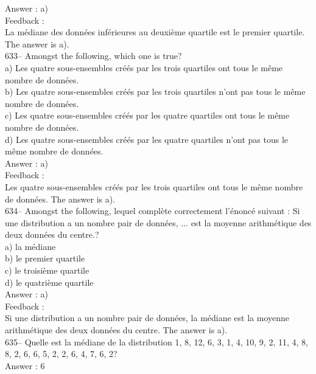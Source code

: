 ﻿\documentclass[letterpaper, 12pt]{article}
\begin{document}
Answer : a)\\

Feedback : \\
La m\'ediane des donn\'ees inf\'erieures au deuxi\`eme quartile est le
premier quartile.  The answer is a).\\

633-- Amongst the following, which one is true?\\
a) Les quatre sous-ensembles cr\'e\'es par les trois quartiles ont tous le
m\^eme nombre de donn\'ees.  \\
b) Les quatre sous-ensembles cr\'e\'es par les trois quartiles n'ont pas
tous le m\^eme nombre de donn\'ees.  \\
c) Les quatre sous-ensembles cr\'e\'es par les quatre quartiles ont tous le
m\^eme nombre de donn\'ees.  \\
d) Les quatre sous-ensembles cr\'e\'es par les quatre quartiles n'ont pas
tous le m\^eme nombre de donn\'ees.  \\

Answer : a)\\

Feedback : \\
Les quatre sous-ensembles cr\'e\'es par les trois quartiles ont tous le
m\^eme nombre de donn\'ees.  The answer is a).\\

634-- Amongst the following, lequel compl\`ete
correctement l'\'enonc\'e suivant : \og Si une distribution a un
nombre pair de donn\'ees, $\ldots$ est la moyenne arithm\'etique des deux donn\'ees du centre.\fg?\\
a) la m\'ediane\\
b) le premier quartile\\
c) le troisi\`eme quartile\\
d) le quatri\`eme quartile\\

Answer : a)\\

Feedback :\\
Si une distribution a un nombre pair de donn\'ees, la m\'ediane est la
moyenne arithm\'etique des deux donn\'ees du centre.  The answer is a).
\\

635--  Quelle est la m\'ediane de la distribution 1, 8, 12, 6, 3, 1, 4, 10,
9, 2, 11, 4, 8, 8, 2, 6, 6, 5, 2, 2, 6, 4, 7, 6, 2?\\

Answer : 6\\
\end{document}

